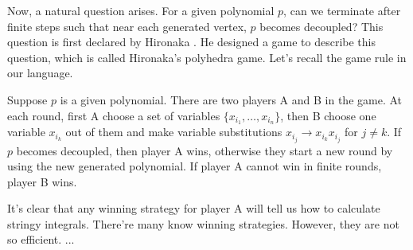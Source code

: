 \documentclass[12pt]{article}
\theoremstyle{definition}
\theoremstyle{plain}
\begin{document}
Now, a natural question arises. For a given polynomial $p$, 
can we terminate after finite steps such that near each generated vertex, $p$ becomes 
decoupled? This question is first declared by Hironaka \cite{hironaka1967}. 
He designed a game to describe this question, which is 
called Hironaka's polyhedra game. Let's recall the game rule in our language.

Suppose $p$ is a given polynomial. There are two players A and B in the game. 
At each round, first A choose a set of variables $\{x_{i_1},\dots,x_{i_n}\}$, then
B choose one variable $x_{i_k}$ out of them and make variable substitutions
$x_{i_j} \to x_{i_k}x_{i_j}$ for $j\neq k$.
If $p$ becomes decoupled, then player A wins, otherwise they start a new round by using the 
new generated polynomial. If player A cannot win in finite rounds, player B wins.


It's clear that any winning strategy for player A will tell us how to 
calculate stringy integrals. There're many know winning strategies.
\cite{spivakovsky1983solution,zeillinger2006short,hauser2003hironaka}
However, they are not so efficient. ... 
\end{document}
